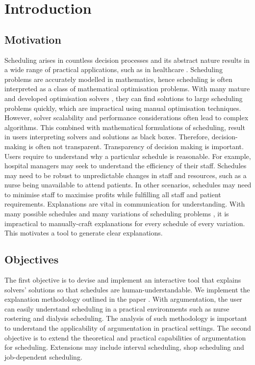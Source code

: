 \chapter{Introduction}
	
\section{Motivation}

Scheduling arises in countless decision processes and its abstract nature results in a wide range of practical applications, such as in healthcare \cite{sanr,operations}. Scheduling problems are accurately modelled in mathematics, hence scheduling is often interpreted as a class of mathematical optimisation problems. With many mature and developed optimisation solvers \cite{clp}, they can find solutions to large scheduling problems quickly, which are impractical using manual optimisation techniques. However, solver scalability and performance considerations often lead to complex algorithms. This combined with mathematical formulations of scheduling, result in users interpreting solvers and solutions as black boxes. Therefore, decision-making is often not transparent.
\linespace
Transparency of decision making is important. Users require to understand why a particular schedule is reasonable. For example, hospital managers may seek to understand the efficiency of their staff. Schedules may need to be robust to unpredictable changes in staff and resources, such as a nurse being unavailable to attend patients. In other scenarios, schedules may need to minimise staff to maximise profits while fulfilling all staff and patient requirements.
\linespace
Explanations are vital in communication for understanding. With many possible schedules and many variations of scheduling problems \cite{sta}, it is impractical to manually-craft explanations for every schedule of every variation. This motivates a tool to generate clear explanations.

\section{Objectives}
\label{objectives}

The first objective is to devise and implement an interactive tool that explains solvers' solutions so that schedules are human-understandable. We implement the explanation methodology outlined in the paper \cite{aes}. With argumentation, the user can easily understand scheduling in a practical environments such as nurse rostering and dialysis scheduling. The analysis of such methodology is important to understand the applicability of argumentation in practical settings.
\linespace
The second objective is to extend the theoretical and practical capabilities of argumentation for scheduling. Extensions may include interval scheduling, shop scheduling and job-dependent scheduling.


